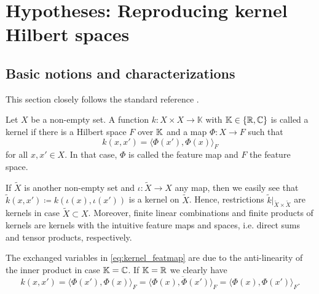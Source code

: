 \chapter{Hypotheses: Reproducing kernel Hilbert spaces}
\label{chapter:rkhs}

\section{Basic notions and characterizations}

This section closely follows the standard reference 
\cite[Chapter 4]{steinwart}.

\begin{defn}
    Let $X$ be a non-empty set.
    A function $k \colon X \times X \to \mathbb K$
    with $\mathbb{K} \in \{ \mathbb{R}, \mathbb{C} \}$
    is called a kernel 
    if there is a Hilbert space $F$ over $\mathbb{K}$ 
    and a map $\Phi \colon X \to F$ such that
    \begin{equation} \label{eq:kernel_featmap}
        k(x,x') = \langle \Phi(x'), \Phi(x) \rangle_F
    \end{equation}
    for all $x,x' \in X$.
    In that case, $\Phi$ is called the feature map
    and $F$ the feature space.
\end{defn}

If $\tilde X$ is another non-empty set and $\iota \colon \tilde X \to X$ 
any map, then we easily see that 
$\tilde k(x,x') \coloneqq k(\iota(x), \iota(x'))$ 
is a kernel on $\tilde X$.
Hence, restrictions $\tilde k |_{\tilde X \times \tilde X}$
are kernels in case $\tilde X \subset X$.
Moreover, finite linear combinations and finite products of kernels
are kernels with the intuitive feature maps and spaces, i.e. direct
sums and tensor products, respectively.

The exchanged variables in \cref{eq:kernel_featmap} are due to the 
anti-linearity of the inner product in case $\mathbb{K} = \mathbb{C}$.
If $\mathbb{K} = \mathbb{R}$ we clearly have 
\begin{equation*}
    k(x,x') = \langle \Phi(x'), \Phi(x) \rangle_F 
    = \overline{\langle \Phi(x), \Phi(x') \rangle_F}
    = \langle \Phi(x), \Phi(x') \rangle_F.
\end{equation*}

